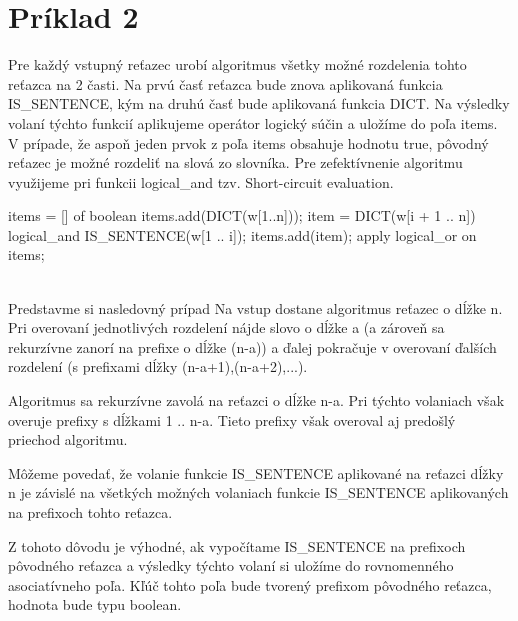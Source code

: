 \documentclass[paper=a4, fontsize=11pt]{scrartcl} %
\numberwithin{equation}{section} %
\numberwithin{figure}{section} %
\numberwithin{table}{section} %
\begin{document}
\pagebreak


\section*{Príklad 2}

Pre každý vstupný reťazec urobí algoritmus všetky možné rozdelenia tohto reťazca na 2 časti.
Na prvú časť reťazca bude znova aplikovaná funkcia IS\_SENTENCE, kým na druhú časť bude aplikovaná funkcia DICT.
Na výsledky volaní týchto funkcií aplikujeme operátor logický súčin a uložíme do poľa items.
V prípade, že aspoň jeden prvok z poľa items obsahuje hodnotu true, pôvodný reťazec je možné rozdeliť na slová zo slovníka.
Pre zefektívnenie algoritmu využijeme pri funkcii logical\_and tzv. Short-circuit evaluation.



\begin{algorithmic}[1]
        \State items = [] of boolean
        \State items.add(DICT(w[1..n]));
        	\State item = DICT(w[i + 1 .. n]) logical\_and IS\_SENTENCE(w[1 .. i]);
		\State items.add(item);
        \EndFor
        \State \Return apply logical\_or on items;
    \EndFunction
\end{algorithmic}
\ \\

Predstavme si nasledovný prípad
Na vstup dostane algoritmus reťazec o dĺžke n.
Pri overovaní jednotlivých rozdelení nájde slovo o dĺžke a (a zároveň sa rekurzívne zanorí na prefixe o dĺžke (n-a)) a ďalej pokračuje v overovaní ďalších rozdelení (s prefixami dĺžky (n-a+1),(n-a+2),...).

Algoritmus sa rekurzívne zavolá na reťazci o dĺžke n-a.
Pri týchto volaniach však overuje prefixy s dĺžkami 1 .. n-a. Tieto prefixy však overoval aj predošlý priechod algoritmu.

Môžeme povedať, že volanie funkcie IS\_SENTENCE aplikované na reťazci dĺžky n je závislé na všetkých možných volaniach funkcie IS\_SENTENCE aplikovaných na prefixoch tohto reťazca.

Z tohoto dôvodu je výhodné, ak vypočítame IS\_SENTENCE na prefixoch pôvodného reťazca a výsledky týchto volaní si uložíme do rovnomenného asociatívneho poľa.
Kľúč tohto poľa bude tvorený prefixom pôvodného reťazca, hodnota bude typu boolean.
\end{document}
